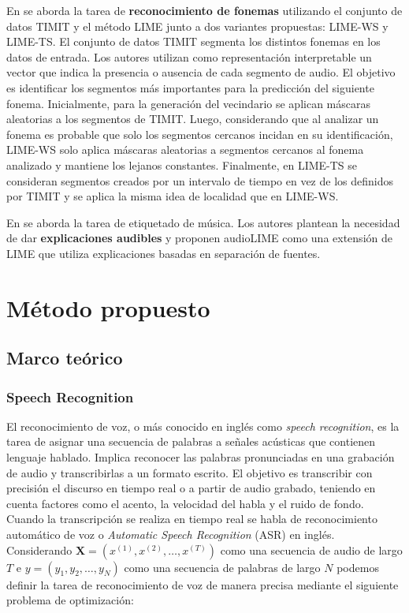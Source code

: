 \documentclass[conference]{IEEEtran}
\begin{document}
En \cite{wu2023trust} se aborda la tarea de \textbf{reconocimiento de fonemas} utilizando el conjunto de datos TIMIT \cite{timit} y el método LIME junto a dos variantes propuestas: LIME-WS y LIME-TS. El conjunto de datos TIMIT segmenta los distintos fonemas en los datos de entrada. Los autores utilizan como representación interpretable un vector que indica la presencia o ausencia de cada segmento de audio. El objetivo es identificar los segmentos más importantes para la predicción del siguiente fonema. Inicialmente, para la generación del vecindario se aplican máscaras aleatorias a los segmentos de TIMIT. Luego, considerando que al analizar un fonema es probable que solo los segmentos cercanos incidan en su identificación, LIME-WS solo aplica máscaras aleatorias a segmentos cercanos al fonema analizado y mantiene los lejanos constantes. Finalmente, en LIME-TS se consideran segmentos creados por un intervalo de tiempo en vez de los definidos por TIMIT y se aplica la misma idea de localidad que en LIME-WS.

En \cite{DBLP:journals/corr/abs-2008-00582} se aborda la tarea de etiquetado de música. Los autores plantean la necesidad de dar \textbf{explicaciones audibles} y proponen audioLIME como una extensión de LIME que utiliza explicaciones basadas en separación de fuentes.

\section{Método propuesto}

\subsection{Marco teórico}

\subsubsection{Speech Recognition}
El reconocimiento de voz, o más conocido en inglés como \textit{speech recognition}, es la tarea de asignar una secuencia de palabras a señales acústicas que contienen lenguaje hablado. 
Implica reconocer las palabras pronunciadas en una grabación de audio y transcribirlas a un formato escrito. El objetivo es transcribir con precisión el discurso en tiempo real o a partir de audio grabado, teniendo en cuenta factores como el acento, la velocidad del habla y el ruido de fondo.
Cuando la transcripción se realiza en tiempo real se habla de reconocimiento automático de voz o \textit{Automatic Speech Recognition} (ASR) en inglés. Considerando $\mathbf{X} = (x^{(1)}, x^{(2)} ,\dots, x^{(T)})$ como una secuencia de audio de largo $T$ e $y = (y_1, y_2, \dots, y_N)$ como una secuencia de palabras de largo $N$ podemos definir la tarea de reconocimiento de voz de manera precisa mediante el siguiente problema de optimización:
\end{document}
